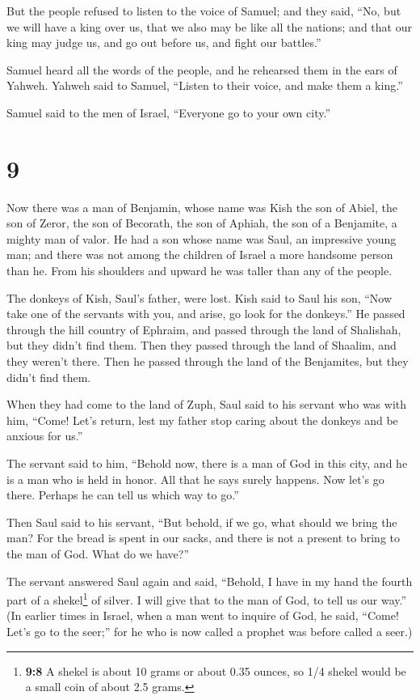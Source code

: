  But the people refused to listen to the voice of Samuel;
and they said, ``No, but we will have a king over us, 
that we also may be like all the nations; and that our king may judge
us, and go out before us, and fight our battles.''

 Samuel heard all the words of the people, and he
rehearsed them in the ears of Yahweh.  Yahweh said to
Samuel, ``Listen to their voice, and make them a king.''

Samuel said to the men of Israel, ``Everyone go to your own city.''

\hypertarget{section-8}{%
\section{9}\label{section-8}}

 Now there was a man of Benjamin, whose name was Kish the
son of Abiel, the son of Zeror, the son of Becorath, the son of Aphiah,
the son of a Benjamite, a mighty man of valor.  He had a
son whose name was Saul, an impressive young man; and there was not
among the children of Israel a more handsome person than he. From his
shoulders and upward he was taller than any of the people.

 The donkeys of Kish, Saul's father, were lost. Kish said
to Saul his son, ``Now take one of the servants with you, and arise, go
look for the donkeys.''  He passed through the hill
country of Ephraim, and passed through the land of Shalishah, but they
didn't find them. Then they passed through the land of Shaalim, and they
weren't there. Then he passed through the land of the Benjamites, but
they didn't find them.

 When they had come to the land of Zuph, Saul said to his
servant who was with him, ``Come! Let's return, lest my father stop
caring about the donkeys and be anxious for us.''

 The servant said to him, ``Behold now, there is a man of
God in this city, and he is a man who is held in honor. All that he says
surely happens. Now let's go there. Perhaps he can tell us which way to
go.''

 Then Saul said to his servant, ``But behold, if we go,
what should we bring the man? For the bread is spent in our sacks, and
there is not a present to bring to the man of God. What do we have?''

 The servant answered Saul again and said, ``Behold, I
have in my hand the fourth part of a shekel\footnote{\textbf{9:8} A
  shekel is about 10 grams or about 0.35 ounces, so 1/4 shekel would be
  a small coin of about 2.5 grams.} of silver. I will give that to the
man of God, to tell us our way.''  (In earlier times in
Israel, when a man went to inquire of God, he said, ``Come! Let's go to
the seer;'' for he who is now called a prophet was before called a
seer.)

